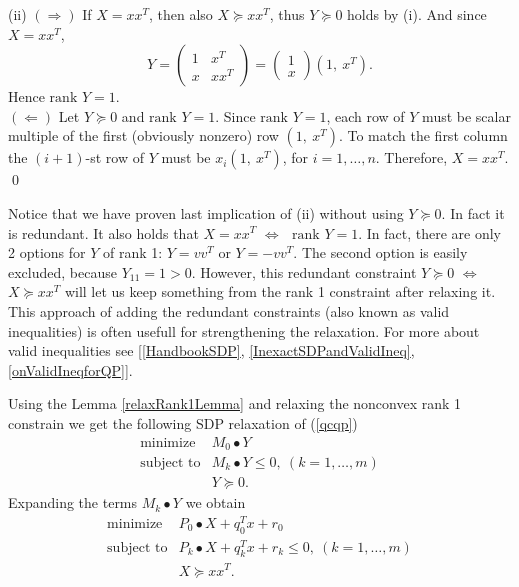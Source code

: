 \documentclass[10pt,oneside]{book}
\theoremstyle{definition}
\begin{document}
(ii) $(\Rightarrow)$ If $X=xx^T$, then also $X\succeq xx^T$, thus $Y\succeq 0$ holds by (i). And since $X=xx^T$,
$$Y=\left(
\begin{array}{cc}
1 & x^T\\
x & xx^T
\end{array}\right)
=  \left(\begin{array}{c}
1\\
x
\end{array}\right)
(1,\ x^T).
$$
Hence $\mbox{rank } Y=1$.\\
$(\Leftarrow)$ Let $Y\succeq 0$ and $\mbox{rank } Y=1$. Since $\mbox{rank } Y=1$, each row of $Y$ must be scalar multiple of the first (obviously nonzero) row $(1,\ x^T)$. To match the first column the $(i+1)$-st row of $Y$ must be $x_i(1,\ x^T)$, for $i=1,\dots , n$.
Therefore, $X=xx^T.$
\qed

\rem Notice that we have proven last implication of (ii) without using $Y\succeq 0$. In fact it is redundant. It also holds that $X=xx^T$ $\Leftrightarrow$ $\mbox{ rank } Y=1$. In fact, there are only 2 options for $Y$ of rank 1: $Y = vv^T$ or $Y = -vv^T$. The second option is easily excluded, because $Y_{11}=1>0$. However, this redundant constraint $Y\succeq 0$ $\Leftrightarrow$ $X\succeq xx^T$ will 
let us keep something from the rank 1 constraint after relaxing it. This approach of adding the redundant constraints (also known as valid inequalities) is often usefull for strengthening the relaxation. For more about valid inequalities see [\ref{HandbookSDP}, \ref{InexactSDPandValidIneq}, \ref{onValidIneqforQP}].

Using the Lemma \ref{relaxRank1Lemma} and relaxing the nonconvex rank 1 constrain we get the following SDP relaxation of (\ref{qcqp})
\begin{equation} 
\label{SDPrelax1}
\begin{array}{ll}
\mbox{minimize}& M_0\bullet Y \\
\mbox{subject to}& M_k\bullet Y \leq 0, \  (k = 1,\dots ,m)\\
& Y\succeq 0.
\end{array} 
\end{equation}
Expanding the terms $M_k\bullet Y$ we obtain
\begin{equation}
\label{SDPrelax2} 
\begin{array}{ll}
\mbox{minimize}& P_0\bullet X + q_0^Tx + r_0\\
\mbox{subject to}& P_k\bullet X+ q_k^Tx + r_k \leq 0, \  (k = 1,\dots ,m)\\
& X\succeq xx^T.
\end{array} 
\end{equation}
\end{document}
